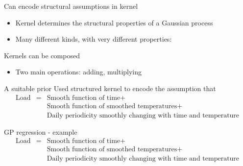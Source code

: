 \begin{frame}{Can encode structural assumptions in kernel}
  \begin{itemize} 
	\item Kernel determines the structural properties of a Gaussian process
	\item Many different kinds, with very different properties:
  \end{itemize}
  
\end{frame}

\begin{frame}{Kernels can be composed}
  \begin{itemize} 
	\item Two main operations: adding, multiplying
  \end{itemize}
  
\end{frame}

%    

\begin{frame}{A suitable prior}
  Used structured kernel to encode the assumption that
  \begin{eqnarray*}
    \textrm{Load} & = & \textrm{Smooth function of time} +  \\
    & & \textrm{Smooth function of smoothed temperatures} + \\
    & & \textrm{Daily periodicity smoothly changing with time and temperature}
  \end{eqnarray*}
  \begin{center}
    
  \end{center}
\end{frame}

\begin{frame}{GP regression - example}
    \begin{eqnarray*}
    \textrm{Load} & = & \textrm{Smooth function of time} +  \\
    & & \textrm{Smooth function of smoothed temperatures} + \\
    & & \textrm{Daily periodicity smoothly changing with time and temperature}
  \end{eqnarray*}
  \begin{center}
    
  \end{center}
\end{frame}

